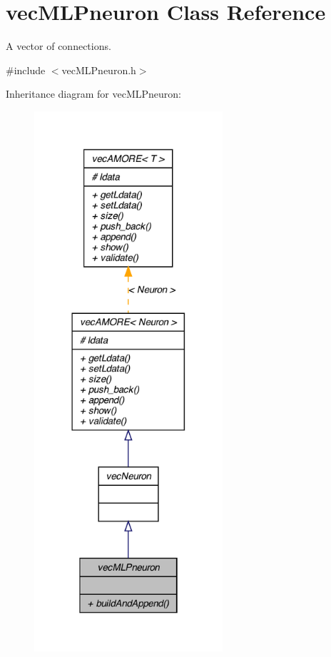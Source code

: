 \hypertarget{classvec_m_l_pneuron}{
\section{vecMLPneuron Class Reference}
\label{classvec_m_l_pneuron}
}


A vector of connections.  




{\ttfamily \#include $<$vecMLPneuron.h$>$}



Inheritance diagram for vecMLPneuron:\nopagebreak
\begin{figure}[H]
\begin{center}
\leavevmode
\includegraphics[width=198pt]{classvec_m_l_pneuron__inherit__graph}
\end{center}
\end{figure}


